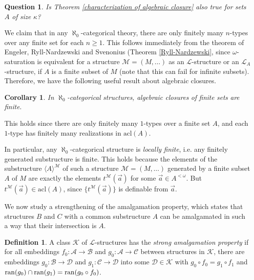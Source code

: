 \documentclass[10pt]{amsart}
\renewcommand{\L}{\mathcal{L}}
\newcommand{\M}{\mathcal{M}}
\newcommand{\ran}[1]{{{\rm{ran}}(#1)}}
\newcommand{\MM}{\mathcal{M}}
\newcommand{\KK}{\mathcal{K}}
\renewcommand{\AA}{\mathcal{A}}
\newcommand{\BB}{\mathcal{B}}
\newcommand{\CC}{\mathcal{C}}
\newcommand{\DD}{\mathcal{D}}
\newcommand{\acl}{\mathrm{acl}}
\newtheorem{corollary}[theorem]{Corollary}
\newtheorem{question}[theorem]{Question}
\theoremstyle{definition}
\newtheorem{definition}[theorem]{Definition}
\theoremstyle{remark}
\begin{document}
\begin{question} 
Is Theorem \ref{characterization of algebraic closure} also true for sets $A$ of size $\kappa$?  
\end{question} 

We claim that in any $\aleph_0$-categorical theory, there are only finitely many $n$-types over any finite set for each $n\geq 1$. This follows immediately from the theorem of Engeler, Ryll-Nardzewski and Svenonius (Theorem \ref{Ryll-Nardzewski}, since $\omega$-saturation is equivalent for a structure $\M=(M,\dots)$ as an $\L$-structure or an $\L_A$-structure, if $A$ is a finite subset of $M$ (note that this can fail for infinite subsets). Therefore, we have the following useful result about algebraic closures. 

\begin{corollary} \label{finite algebraic closures} 
In $\aleph_0$-categorical structures, algebraic closures of finite sets are finite. 
\end{corollary} 

This holds since there are only finitely many $1$-types over a finite set $A$, and each $1$-type has finitely many realizations in $\acl(A)$. 

In particular, any $\aleph_0$-categorical structure is \emph{locally finite}, i.e. any finitely generated substructure is finite. This holds because the elements of the substructure $\langle A\rangle^\MM$ of such a structure $\MM=(M,\dots)$ generated by a finite subset $A$ of $M$ are exactly the elements $t^\MM(\vec{a})$ for some $\vec{a}\in A^{<\omega}$. But $t^\MM(\vec{a})\in\acl(A)$, since $\{t^\MM(\vec{a})\}$ is definable from $\vec{a}$. 


We now study a strengthening of the amalgamation property, which states that structures $B$ and $C$ with a common substructure $A$ can be amalgamated in such a way that their intersection is $A$. 

\begin{definition} 
A class $\KK$ of $\L$-structures has the \emph{strong amalgamation property} if for all embeddings $f_0\colon \AA\rightarrow \BB$ and $g_0\colon \AA\rightarrow \CC$ between structures in $\KK$, there are embeddings $g_0\colon \BB\rightarrow \DD$ and $g_1\colon \CC\rightarrow \DD$ into some $\DD\in\KK$ with $g_0\circ f_0=g_1\circ f_1$ and $\ran{g_0}\cap \ran{g_1}=\ran{g_0\circ f_0}$. 
\end{definition} 
\end{document}
